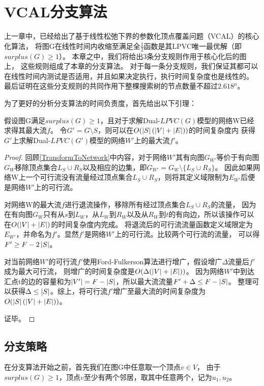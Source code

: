 \section{VCAL分支算法}
上一章中，已经给出了基于线性松弛下界的参数化顶点覆盖问题（VCAL）的核心化算法，
将图G在线性时间内收缩至满足全$\frac{1}{2}$函数是其LPVC唯一最优解（即$surplus(G) \ge 1$）。
本章之中，我们将给出3条分支规则作用于核心化后的图上，
这些规则组成了本章的分支算法。
对于每一条分支规则，我们保证其都可以在线性时间内测试是否适用，并且如果决定执行，执行时间复杂度也是线性的。
最后证明在这些分支规则的共同作用下整棵搜索树的节点数量不超过$2.618^\mu$。

\vspace{0.5cm}
为了更好的分析分支算法的时间负责度，首先给出以下引理：
\begin{lemma} \label{LemmaUpdateMaxflow}
假设图G满足$surplus(G) \ge 1$，且对于求解Dual-$LPVC(G)$模型的网络W已经求得其最大流$f$。
令$G' = G \setminus S$，则可以在$O(\left\vert S \right\vert(\left\vert V \right\vert + \left\vert E \right\vert))$的时间复杂度内
获得$G'$上求解Dual-$LPVC(G')$模型的网络$W'$上的最大流$f'$。
\end{lemma}

\begin{proof}
回顾\ref{TransformToNetwork}中内容，对于网络$W'$其有向图$G_{W'}$等价于有向图$G_W$移除顶点集合$L_S \cup R_S$以及相应的边集，即$G_{W'} = G_W \setminus \{L_S \cup R_S\}$。
因此如果网络W上一个可行流没有流量经过顶点集合$L_S \cup R_S$，则将其定义域限制为$E_{W'}$后便是网络$W'$上的可行流。

对网络W的最大流$f$进行退流操作，移除所有经过顶点集合$L_S \cup R_S$的流量，
因为在有向图$G_W$只有从$s$到$L_W$，从$L_W$到$R_W$以及从$R_W$到$t$的有向边，所以该操作可以在$O(\left\vert V \right\vert + \left\vert E \right\vert)$的时间复杂度内完成。
将退流后的可行流流量函数定义域限定为$E_{W'}$，并命名为$f'$。显然$f'$是网络$W'$上的可行流。比较两个可行流的流量，
可以得$F' \ge F - 2 \left\vert S \right\vert$。

对当前网络$W'$的可行流$f'$使用Ford-Fulkerson算法进行增广，假设增广$\Delta$流量后$f'$成为最大可行流，
则增广的时间复杂度是$O(\Delta(\left\vert V \right\vert + \left\vert E \right\vert))$。
因为网络$W'$中到达汇点t的边的容量和为$\left\vert V' \right\vert = F - \left\vert S \right\vert$，所以最大流流量$F' + \Delta \le F - \left\vert S \right\vert$。
整理可以获得$\Delta \le \left\vert S \right\vert$。综上，将可行流$f'$增广至最大流的时间复杂度为$O(\left\vert S \right\vert(\left\vert V \right\vert + \left\vert E \right\vert))$。

证毕。
\end{proof}


\subsection{分支策略}
在分支算法开始之前，首先我们在图G中任意取一个顶点$v \in V$，
由于$surplus(G) \ge 1$，顶点$v$至少有两个邻居，取其中任意两个，记为$u_1, u_2$。



